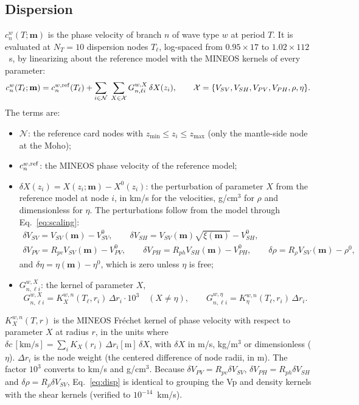 \documentclass[11pt]{article}
\newcommand{\vsv}{V_{SV}}
\newcommand{\vsh}{V_{SH}}
\newcommand{\vpv}{V_{PV}}
\newcommand{\vph}{V_{PH}}
\begin{document}
\subsection{Dispersion}\label{sec:disp}
$c^w_n(T;\mathbf{m})$ is the phase velocity of branch $n$ of wave type $w$
at period $T$. It is evaluated at $N_T=10$ dispersion nodes $T_\ell$,
log-spaced from $0.95\times17$ to $1.02\times112$~s, by linearizing about
the reference model with the MINEOS kernels of every parameter:
\begin{equation}\label{eq:disp}
  c^w_n(T_\ell;\mathbf{m})=c^{w,\rm ref}_n(T_\ell)+\sum_{i\in\mathcal{N}}\;
  \sum_{X\in\mathcal{X}}G^{w,X}_{n,\ell i}\,\delta X(z_i),\qquad
  \mathcal{X}=\{\vsv,\vsh,\vpv,\vph,\rho,\eta\}.
\end{equation}
The terms are:
\begin{itemize}
\item $\mathcal{N}$: the reference card nodes with
  $z_{\min}\le z_i\le z_{\max}$ (only the mantle-side node at the Moho);
\item $c^{w,\rm ref}_n$: the MINEOS phase velocity of the reference model;
\item $\delta X(z_i)=X(z_i;\mathbf{m})-X^0(z_i)$: the perturbation of
  parameter $X$ from the reference model at node $i$, in km/s for the
  velocities, g/cm$^3$ for $\rho$ and dimensionless for $\eta$. The
  perturbations follow from the model through Eq.~\eqref{eq:scaling}:
  \begin{gather*}
   \delta\vsv=\vsv(\mathbf{m})-\vsv^0,\qquad \delta\vsh=\vsv(\mathbf{m})\sqrt{\xi(\mathbf{m})}-\vsh^0,\\
   \delta\vpv=R_{pv}\vsv(\mathbf{m})-\vpv^0,\qquad \delta\vph=R_{ph}\vsh(\mathbf{m})-\vph^0,\qquad
   \delta\rho=R_\rho\vsv(\mathbf{m})-\rho^0,
  \end{gather*}
  and $\delta\eta=\eta(\mathbf{m})-\eta^0$, which is zero unless $\eta$ is
  free;
\item $G^{w,X}_{n,\ell i}$: the kernel of parameter $X$,
  \begin{equation}
   G^{w,X}_{n,\ell i}=K^{w,n}_{X}(T_\ell,r_i)\,\Delta r_i\cdot10^3\quad(X\ne\eta),\qquad
   G^{w,\eta}_{n,\ell i}=K^{w,n}_{\eta}(T_\ell,r_i)\,\Delta r_i .
  \end{equation}
\end{itemize}
$K^{w,n}_{X}(T,r)$ is the MINEOS Fréchet kernel of phase velocity with
respect to parameter $X$ at radius $r$, in the units where
$\delta c\,[\text{km/s}]=\sum_iK_X(r_i)\,\Delta r_i[\text{m}]\,\delta X$, with
$\delta X$ in m/s, kg/m$^3$ or dimensionless ($\eta$). $\Delta r_i$ is the
node weight (the centered difference of node radii, in m). The factor
$10^3$ converts to km/s and g/cm$^3$. Because
$\delta\vpv=R_{pv}\delta\vsv$, $\delta\vph=R_{ph}\delta\vsh$ and
$\delta\rho=R_\rho\delta\vsv$, Eq.~\eqref{eq:disp} is identical to
grouping the Vp and density kernels with the shear kernels (verified to
$10^{-14}$~km/s).
\end{document}
